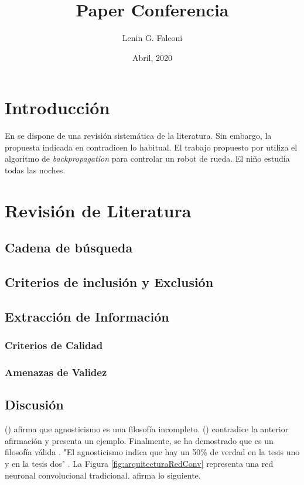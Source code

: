 \documentclass[12pt]{report} %
\title{Paper                 Conferencia}
\author{Lenin G. Falconi }
\date{Abril, 2020}
\begin{document}
\maketitle
\tableofcontents
\section{Introducción}
En \cite{nogueira2017image} se       dispone de una revisión sistemática de la literatura. Sin embargo, la propuesta indicada en \cite{dawkins_biology_2016} contradicen lo habitual. El trabajo propuesto por \cite{priandana2018backprop} utiliza el algoritmo de \textit{backpropagation} para controlar un robot de rueda. El niño estudia todas las noches.

\lipsum[2-4] 

\section{Revisión de Literatura}
\subsection{Cadena de búsqueda}
\lipsum[1-4]
\subsection{Criterios de inclusión y Exclusión}
\lipsum[1-4]
\subsection{Extracción de Información}
\subsubsection{Criterios de Calidad}
\lipsum[1-4]
\subsubsection{Amenazas de Validez}
\lipsum[1-4]
\subsection{Discusión}
\citeauthor{dawkins_biology_2016} (\citeyear{dawkins_biology_2016}) afirma que agnosticismo es una filosofía incompleto. \citeauthor{nogueira2017image} (\citeyear{nogueira2017image}) contradice la anterior afirmación y presenta un ejemplo. Finalmente, se ha demostrado que es un filosofía válida \parencite[ver pag 92]{priandana2018backprop}. "El agnosticismo indica que hay un 50\% de verdad en la tesis uno y en la tesis dos" \textcite{nogueira2017image}. La Figura \ref{fig:arquitecturaRedConv} representa una red neuronal convolucional tradicional. \textcite{saha2018} afirma lo siguiente.
\end{document}
